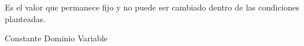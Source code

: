 
\question Es el valor que permanece fijo y no puede ser cambiado dentro de
las condiciones planteadas.

  \begin{oneparchoices}
    \choice Constante
    \choice Dominio
    \choice Variable
  \end{oneparchoices}
